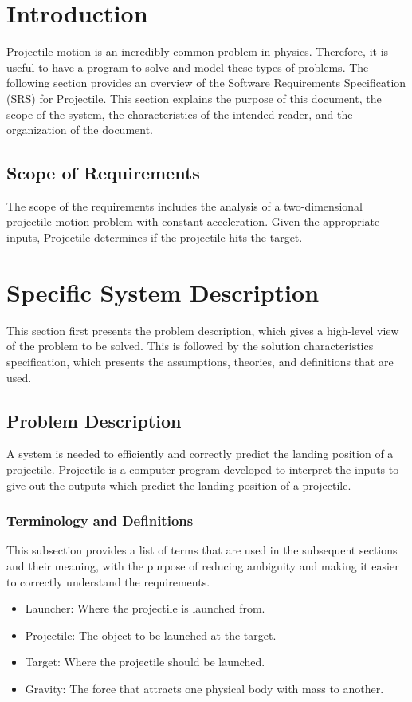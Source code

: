 \documentclass[12pt]{article}
\begin{document}
\section{Introduction}
\label{Sec:Intro}
Projectile motion is an incredibly common problem in physics. Therefore, it is useful to have a program to solve and model these types of problems.
The following section provides an overview of the Software Requirements Specification (SRS) for Projectile. This section explains the purpose of this document, the scope of the system, the characteristics of the intended reader, and the organization of the document.
\subsection{Scope of Requirements}
\label{Sec:ReqsScope}
The scope of the requirements includes the analysis of a two-dimensional projectile motion problem with constant acceleration. Given the appropriate inputs, Projectile determines if the projectile hits the target.
\section{Specific System Description}
\label{Sec:SpecSystDesc}
This section first presents the problem description, which gives a high-level view of the problem to be solved. This is followed by the solution characteristics specification, which presents the assumptions, theories, and definitions that are used.
\subsection{Problem Description}
\label{Sec:ProbDesc}
A system is needed to efficiently and correctly predict the landing position of a projectile. Projectile is a computer program developed to interpret the inputs to give out the outputs which predict the landing position of a projectile.
\subsubsection{Terminology and Definitions}
\label{Sec:TermDefs}
This subsection provides a list of terms that are used in the subsequent sections and their meaning, with the purpose of reducing ambiguity and making it easier to correctly understand the requirements.
\begin{itemize}
\item{Launcher: Where the projectile is launched from.}
\item{Projectile: The object to be launched at the target.}
\item{Target: Where the projectile should be launched.}
\item{Gravity: The force that attracts one physical body with mass to another.}
\end{itemize}
\end{document}

